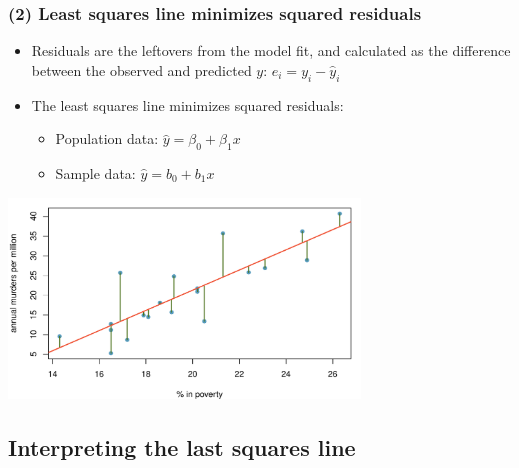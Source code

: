 \documentclass[11pt,containsverbatim,handout,xcolor=xelatex,dvipsnames,table]{beamer}
\begin{document}
\begin{frame}
\frametitle{(2) Least squares line minimizes squared residuals}

\begin{itemize}

\item Residuals are the leftovers from the model fit, and calculated as the difference between the observed and predicted $y$: $e_i = y_i - \hat{y}_i$

\item The least squares line minimizes squared residuals:
\begin{itemize}
\item Population data: $\hat{y} = \beta_0 + \beta_1 x$
\item Sample data: $\hat{y} = b_0 + b_1 x$
\end{itemize}

\end{itemize}

\begin{center}
\includegraphics[width=0.7\textwidth]{figures/murder/annual_murders_per_mil_perc_pov_res}
\end{center}

\end{frame}


\subsection{Interpreting the last squares line}
\label{mi3}

\end{document}
